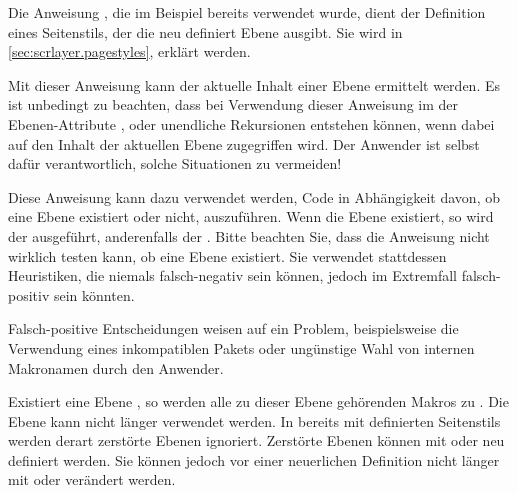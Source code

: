 Die Anweisung
, die
im Beispiel bereits verwendet wurde, dient der Definition eines Seitenstils,
der die neu definiert Ebene ausgibt. Sie wird in
\autoref{sec:scrlayer.pagestyles},
 erklärt werden.%
\EndIndexGroup


\begin{Declaration}
\end{Declaration}
Mit dieser Anweisung kann der aktuelle
Inhalt einer Ebene ermittelt werden. Es ist unbedingt zu
beachten, dass bei Verwendung dieser Anweisung im  der
Ebenen-Attribute ,  oder
 unendliche Rekursionen entstehen können, wenn dabei auf
den Inhalt der aktuellen Ebene zugegriffen wird. Der Anwender ist selbst dafür
verantwortlich, solche Situationen zu vermeiden!%
\EndIndexGroup


\begin{Declaration}
\end{Declaration}
Diese Anweisung kann dazu verwendet werden, Code in Abhängigkeit davon, ob
eine Ebene existiert oder nicht, auszuführen. Wenn die Ebene  existiert, so wird der  ausgeführt, anderenfalls der
. Bitte beachten Sie, dass die Anweisung nicht wirklich
testen kann, ob eine Ebene existiert. Sie verwendet stattdessen Heuristiken,
die niemals falsch-negativ sein können, jedoch im Extremfall falsch-positiv
sein könnten. %
\iffalse%
Nichtsdestotrotz: Falls der Test falsch-positiv ist, läuft etwas
schief. Beispielsweise könnte dies ein Indikator für die Verwendung eines
inkompatiblen Pakets oder dafür sein, dass der Anwender etwas tut, was er
besser nicht tun sollte.%
\else
Falsch-positive Entscheidungen weisen auf ein Problem, beispielsweise die
Verwendung eines inkompatiblen Pakets oder ungünstige Wahl von internen
Makronamen durch den Anwender.%
\fi
\EndIndexGroup


\begin{Declaration}
\end{Declaration}
Existiert eine Ebene , so werden alle zu dieser Ebene
gehörenden Makros zu . Die Ebene kann nicht länger verwendet
werden. In bereits mit  definierten Seitenstils werden
derart zerstörte Ebenen ignoriert. Zerstörte Ebenen können mit
 oder
 neu definiert werden. Sie können jedoch
vor einer neuerlichen Definition nicht länger mit
 oder
 verändert werden.%
\EndIndexGroup


